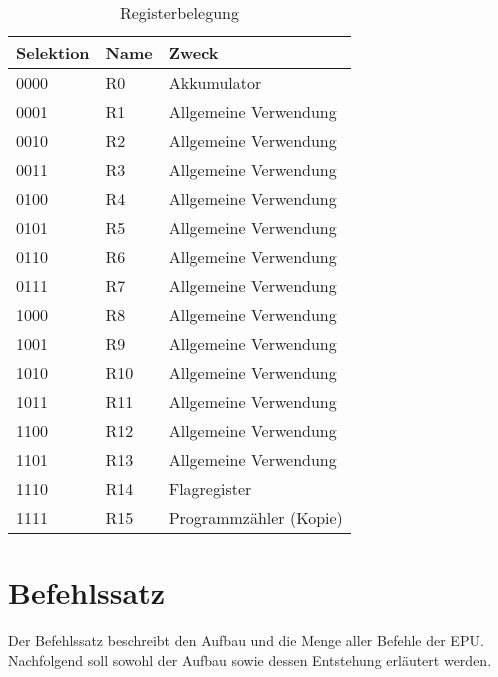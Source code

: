 \begin{table}[h]
\centering
\begin{tabular}{lll}
\toprule
Selektion & Name & Zweck\\
\midrule
0000 & R0  & Akkumulator\\
0001 & R1  & Allgemeine Verwendung\\
0010 & R2  & Allgemeine Verwendung\\
0011 & R3  & Allgemeine Verwendung\\
0100 & R4  & Allgemeine Verwendung\\
0101 & R5  & Allgemeine Verwendung\\
0110 & R6  & Allgemeine Verwendung\\
0111 & R7  & Allgemeine Verwendung\\
1000 & R8  & Allgemeine Verwendung\\
1001 & R9  & Allgemeine Verwendung\\
1010 & R10 & Allgemeine Verwendung\\
1011 & R11 & Allgemeine Verwendung\\
1100 & R12 & Allgemeine Verwendung\\
1101 & R13 & Allgemeine Verwendung\\
1110 & R14 & Flagregister\\
1111 & R15 & Programmzähler (Kopie)\\
\bottomrule
\end{tabular}
\caption{Registerbelegung}
\label{tab:registerbelegung}
\end{table}
\pagebreak
\section{Befehlssatz}
\label{s:befehlssatz}
Der Befehlssatz beschreibt den Aufbau und die Menge aller Befehle der \ac{EPU}.
Nachfolgend soll sowohl der Aufbau sowie dessen Entstehung erläutert werden.

